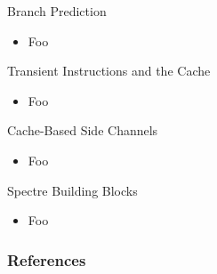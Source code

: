 \documentclass[12pt, dvipsnames, aspectratio=169]{beamer}
\begin{document}
\begin{frame}[c]{Branch Prediction}
  \begin{itemize}
    \item Foo
  \end{itemize}
\end{frame}

\begin{frame}[c]{Transient Instructions and the Cache}
  \begin{itemize}
    \item Foo
  \end{itemize}
\end{frame}

\begin{frame}[c]{Cache-Based Side Channels}
  \begin{itemize}
    \item Foo
  \end{itemize}
\end{frame}

\begin{frame}[c]{Spectre Building Blocks}
  \begin{itemize}
    \item Foo
  \end{itemize}
\end{frame}

\appendix

\nocite{*}
\begin{frame}
  \frametitle{References}
  \sloppy
  \printbibliography
\end{frame}
\end{document}
